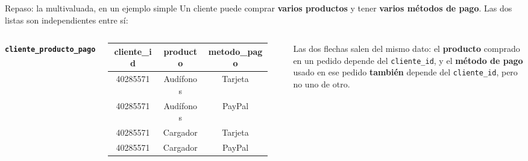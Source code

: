 \documentclass[aspectratio=169,10pt,c]{beamer}
\newcommand{\tblb}[1]{\textcolor{utpNaranja}{\textbf{\texttt{#1}}}}
\begin{document}
\begin{frame}{Repaso: la multivaluada, en un ejemplo simple}
\small Un cliente puede comprar \textbf{varios productos} y tener \textbf{varios métodos de pago}. Las dos listas son independientes entre sí:
\vspace{0.2cm}
\begin{columns}[T,onlytextwidth]
\footnotesize\centering\tblb{cliente\_producto\_pago}\\[3pt]
\begin{tabular}{ccc}
\toprule
\bfseries cliente\_id & \bfseries producto & \bfseries metodo\_pago \\
\midrule
40285571 & Audífonos & Tarjeta \\
40285571 & Audífonos & PayPal \\
40285571 & Cargador  & Tarjeta \\
40285571 & Cargador  & PayPal \\
\bottomrule
\end{tabular}
\begin{center}
\end{center}
\scriptsize\color{utpGris} Las dos flechas salen del mismo dato: el \textbf{producto} comprado en un pedido depende del \texttt{cliente\_id}, y el \textbf{método de pago} usado en ese pedido \textbf{también} depende del \texttt{cliente\_id}, pero no uno de otro.
\end{columns}
\end{frame}
\end{document}
